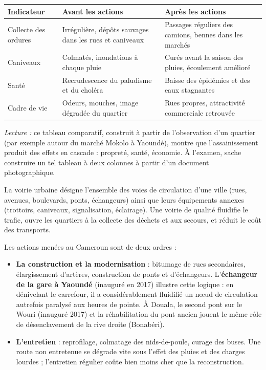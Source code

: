 \documentclass[11pt]{article}
\newcommand{\cle}[1]{{\popxbold\color{popdark}#1}}
\newcounter{popsec}
\newcounter{popsub}
\newcommand{\courssub}[1]{%
  \stepcounter{popsub}%
  \par\vspace{9pt}\noindent{\popxbold\fontsize{11.5}{13}\selectfont\color{popink}{\color{poporange}\thepopsec.\thepopsub}\hspace{6pt}#1}\par\nopagebreak\vspace{4pt}
}
\begin{document}
\begin{exemplebox}
\begin{center}
\begin{tabularx}{\linewidth}{|l|X|X|}
\hline
\rowcolor{popblueL} \textbf{Indicateur} & \textbf{Avant les actions} & \textbf{Après les actions} \\
\hline
Collecte des ordures & Irrégulière, dépôts sauvages dans les rues et caniveaux & Passages réguliers des camions, bennes dans les marchés \\
\hline
Caniveaux & Colmatés, inondations à chaque pluie & Curés avant la saison des pluies, écoulement amélioré \\
\hline
Santé & Recrudescence du paludisme et du choléra & Baisse des épidémies et des eaux stagnantes \\
\hline
Cadre de vie & Odeurs, mouches, image dégradée du quartier & Rues propres, attractivité commerciale retrouvée \\
\hline
\end{tabularx}
\end{center}
\emph{Lecture :} ce tableau comparatif, construit à partir de l'observation d'un quartier (par exemple autour du marché Mokolo à Yaoundé), montre que l'assainissement produit des effets en cascade : propreté, santé, économie. À l'examen, sache construire un tel tableau à deux colonnes à partir d'un document photographique.
\end{exemplebox}

\courssub{L'amélioration de la voirie urbaine}

La \cle{voirie urbaine} désigne l'ensemble des voies de circulation d'une ville (rues, avenues, boulevards, ponts, échangeurs) ainsi que leurs équipements annexes (trottoirs, caniveaux, signalisation, éclairage). Une voirie de qualité fluidifie le trafic, ouvre les quartiers à la collecte des déchets et aux secours, et réduit le coût des transports.

Les actions menées au Cameroun sont de deux ordres :

\begin{itemize}
\item \textbf{La construction et la modernisation} : bitumage de rues secondaires, élargissement d'artères, construction de ponts et d'échangeurs. L'\textbf{échangeur de la gare à Yaoundé} (inauguré en 2017) illustre cette logique : en dénivelant le carrefour, il a considérablement fluidifié un nœud de circulation autrefois paralysé aux heures de pointe. À Douala, le second pont sur le Wouri (inauguré 2017) et la réhabilitation du pont ancien jouent le même rôle de désenclavement de la rive droite (Bonabéri).
\item \textbf{L'entretien} : reprofilage, colmatage des nids-de-poule, curage des buses. Une route non entretenue se dégrade vite sous l'effet des pluies et des charges lourdes ; l'entretien régulier coûte bien moins cher que la reconstruction.
\end{itemize}
\end{document}
